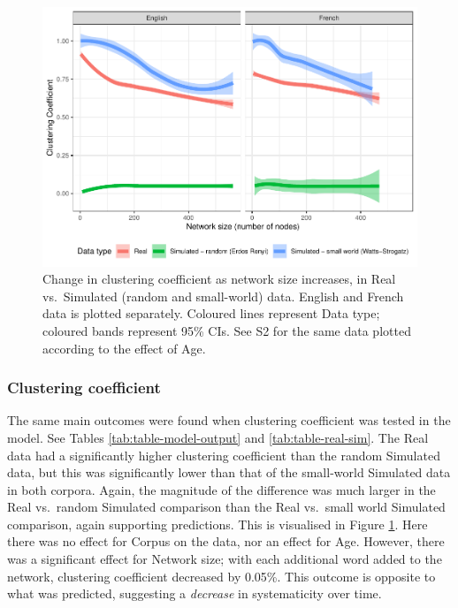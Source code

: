 \documentclass[
  man]{apa6}
\begin{document}
\begin{figure}
\centering
\includegraphics{NetworkGraphs_R2_files/figure-latex/Figure-clust-coef-1.pdf}
\caption{\label{fig:Figure-clust-coef}Change in clustering coefficient as network size increases, in Real vs.~Simulated (random and small-world) data. English and French data is plotted separately. Coloured lines represent Data type; coloured bands represent 95\% CIs. See S2 for the same data plotted according to the effect of Age.}
\end{figure}

\subsubsection{Clustering coefficient}\label{clustering-coefficient}

The same main outcomes were found when clustering coefficient was tested in the model. See Tables \ref{tab:table-model-output} and \ref{tab:table-real-sim}. The Real data had a significantly higher clustering coefficient than the random Simulated data, but this was significantly lower than that of the small-world Simulated data in both corpora. Again, the magnitude of the difference was much larger in the Real vs.~random Simulated comparison than the Real vs.~small world Simulated comparison, again supporting predictions. This is visualised in Figure \ref{fig:Figure-clust-coef}. Here there was no effect for Corpus on the data, nor an effect for Age. However, there was a significant effect for Network size; with each additional word added to the network, clustering coefficient decreased by 0.05\%. This outcome is opposite to what was predicted, suggesting a \emph{decrease} in systematicity over time.
\end{document}
